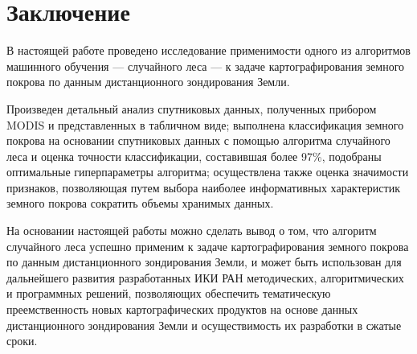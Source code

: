 \documentclass[14pt, a4paper, oneside]{extarticle}
\begin{document}
\section{Заключение}
В настоящей работе проведено исследование применимости одного из алгоритмов машинного обучения --- случайного леса --- к задаче картографирования земного покрова по данным дистанционного зондирования Земли.

Произведен детальный анализ спутниковых данных, полученных прибором MODIS и представленных в табличном виде; выполнена классификация земного покрова на основании спутниковых данных с помощью алгоритма случайного леса и оценка точности классификации, составившая более 97\%, подобраны оптимальные гиперпараметры алгоритма; осуществлена также оценка значимости признаков, позволяющая путем выбора наиболее информативных характеристик земного покрова сократить объемы хранимых данных.

На основании настоящей работы можно сделать вывод о том, что алгоритм случайного леса успешно применим к задаче картографирования земного покрова по данным дистанционного зондирования Земли, и может быть использован для дальнейшего развития разработанных ИКИ РАН методических, алгоритмических и программных решений, позволяющих обеспечить тематическую преемственность новых картографических продуктов на основе данных дистанционного зондирования Земли и осуществимость их разработки в сжатые сроки.

\newpage
\end{document}
